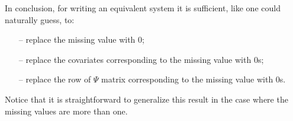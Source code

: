 In conclusion, for writing an equivalent system it is sufficient, like one
could naturally guess, to:
\begin{itemize}
	\item[--] replace the missing value with $0$;
	\item[--] replace the covariates corresponding to the missing value with $0$s;
	\item[--] replace the row of $\Psi$ matrix corresponding to the missing value with $0$s.
\end{itemize}
Notice that it is straightforward to generalize this result in the
case where the missing values are more than one.
